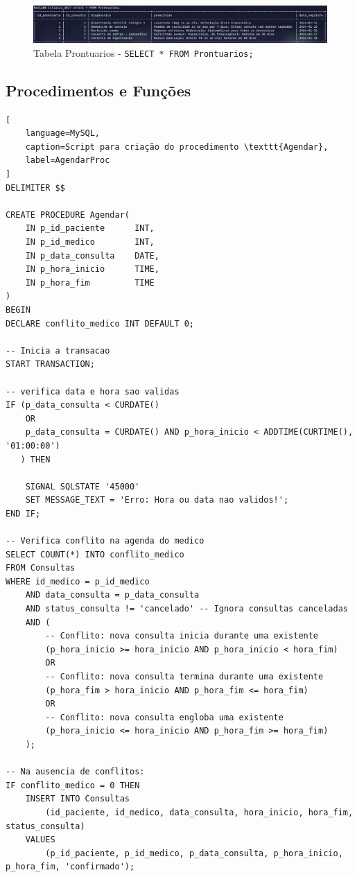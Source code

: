 \begin{figure}[H]
    \centering
    \includegraphics[width=1\linewidth]{Text/DML/Prontuarios.png}
    \caption{Tabela Prontuarios - \texttt{SELECT * FROM Prontuarios;}}
    \label{fig:Prontuarios}
\end{figure}

\newpage
\subsection{Procedimentos e Funções}\label{subsec:proc}
\begin{lstlisting}[
    language=MySQL,
    caption=Script para criação do procedimento \texttt{Agendar},
    label=AgendarProc
]
DELIMITER $$

CREATE PROCEDURE Agendar(
    IN p_id_paciente      INT,
    IN p_id_medico        INT,
    IN p_data_consulta    DATE,
    IN p_hora_inicio      TIME,
    IN p_hora_fim         TIME
)
BEGIN
DECLARE conflito_medico INT DEFAULT 0; 

-- Inicia a transacao
START TRANSACTION;

-- verifica data e hora sao validas
IF (p_data_consulta < CURDATE()
    OR
    p_data_consulta = CURDATE() AND p_hora_inicio < ADDTIME(CURTIME(), '01:00:00')
   ) THEN

    SIGNAL SQLSTATE '45000'
    SET MESSAGE_TEXT = 'Erro: Hora ou data nao validos!';
END IF;

-- Verifica conflito na agenda do medico
SELECT COUNT(*) INTO conflito_medico
FROM Consultas
WHERE id_medico = p_id_medico
    AND data_consulta = p_data_consulta
    AND status_consulta != 'cancelado' -- Ignora consultas canceladas
    AND ( 
        -- Conflito: nova consulta inicia durante uma existente
        (p_hora_inicio >= hora_inicio AND p_hora_inicio < hora_fim) 
        OR
        -- Conflito: nova consulta termina durante uma existente  
        (p_hora_fim > hora_inicio AND p_hora_fim <= hora_fim) 
        OR
        -- Conflito: nova consulta engloba uma existente
        (p_hora_inicio <= hora_inicio AND p_hora_fim >= hora_fim)
    );    

-- Na ausencia de conflitos:
IF conflito_medico = 0 THEN
    INSERT INTO Consultas 
        (id_paciente, id_medico, data_consulta, hora_inicio, hora_fim, status_consulta)
    VALUES
        (p_id_paciente, p_id_medico, p_data_consulta, p_hora_inicio, p_hora_fim, 'confirmado');


\end{lstlisting}
